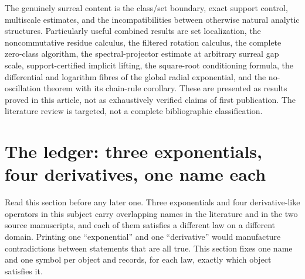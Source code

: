 \documentclass[11pt,letterpaper]{article}
\numberwithin{equation}{section}
\theoremstyle{definition}
\theoremstyle{remark}
\begin{document}
The genuinely surreal content is the class/set boundary, exact support control,
multiscale estimates, and the incompatibilities between otherwise natural analytic
structures. Particularly useful combined results are set localization, the
noncommutative residue calculus, the filtered rotation calculus, the complete zero-class
algorithm, the spectral-projector estimate at arbitrary surreal gap scale,
support-certified implicit lifting, the square-root conditioning formula, the
differential and logarithm fibres of the global radial exponential, and the
no-oscillation theorem with its chain-rule corollary. These are presented as results
proved in this article, not as exhaustively verified claims of first publication. The
literature review is targeted, not a complete bibliographic classification.

\section{The ledger: three exponentials, four derivatives, one name each}\label{squat:sec:ledger}

Read this section before any later one. Three exponentials and four derivative-like
operators in this subject carry overlapping names in the literature and in the two
source manuscripts, and each of them satisfies a different law on a different domain.
Printing one ``exponential'' and one ``derivative'' would manufacture contradictions
between statements that are all true. This section fixes one name and one symbol per
object and records, for each law, exactly which object satisfies it.
\end{document}
